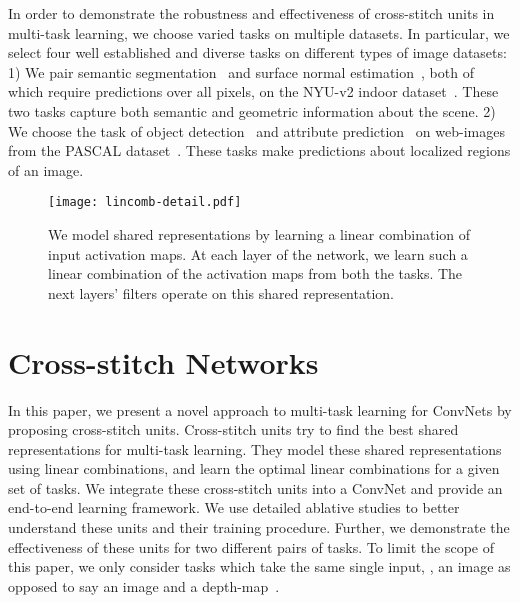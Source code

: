 \documentclass[10pt,twocolumn,letterpaper]{article}
\begin{document}
In order to demonstrate the robustness and effectiveness of cross-stitch units in multi-task learning, we choose varied tasks on multiple datasets. In particular, we select four well established and diverse tasks on different types of image datasets: 1) We pair semantic segmentation~\cite{shi2000normalized,shotton2006textonboost,heitz2008learning} and surface normal estimation~\cite{3dp,eigen2015predicting,wangfouhey}, both of which require predictions over all pixels, on the NYU-v2 indoor dataset~\cite{nyuv2}. These two tasks capture both semantic and geometric information about the scene. 2) We choose the task of object detection~\cite{schneiderman2004object,pedro-dpm,girshick2014rich,fast-rcnn} and attribute prediction~\cite{farhadi2010attribute,abdulnabi2015multi,lampert2009learning} on web-images from the PASCAL dataset~\cite{apascal,pascal}. These tasks make predictions about localized regions of an image.
\begin{figure}[t]
\centering
\texttt{[image: lincomb-detail.pdf]}
\caption{We model shared representations by learning a linear combination of input activation maps. At each layer of the network, we learn such a linear combination of the activation maps from both the tasks. The next layers' filters operate on this shared representation.}
\vspace{-0.1in}
\label{fig:lincomb-detail}
\end{figure}

\section{Cross-stitch Networks}
In this paper, we present a novel approach to multi-task learning for ConvNets by proposing cross-stitch units. Cross-stitch units try to find the best shared representations for multi-task learning. They model these shared representations using linear combinations, and learn the optimal linear combinations for a given set of tasks. We integrate these cross-stitch units into a ConvNet and provide an end-to-end learning framework. We use detailed ablative studies to better understand these units and their training procedure. Further, we demonstrate the effectiveness of these units for two different pairs of tasks. To limit the scope of this paper, we only consider tasks which take the same single input, \eg, an image as opposed to say an image and a depth-map~\cite{rcnn-depth}.
\end{document}
